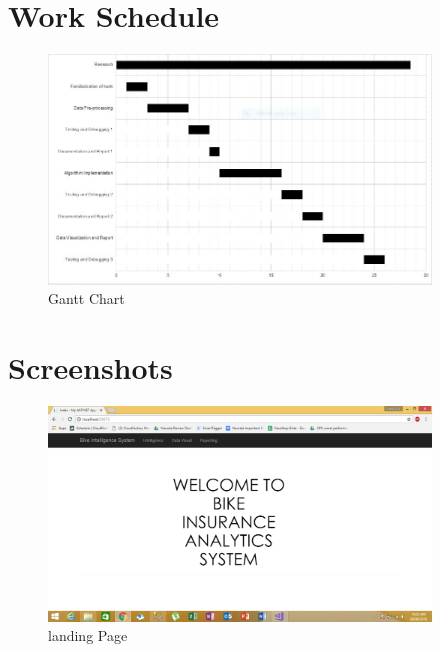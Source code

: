 \section{Work Schedule}
\begin{figure}[tbh] %
\begin{center}
	\includegraphics[width=4in]{images/Capture.JPG}
	\caption{Gantt Chart} %
	\label{Gantt chart} %
\end{center}
\end{figure}

\newpage
\section{Screenshots}
\begin{figure}[tbh] %
\begin{center}
	\includegraphics[width=4in]{images/Screenshot1.png}
	\caption{landing Page} %
	\label{Homepage} %
\end{center}
\end{figure}

